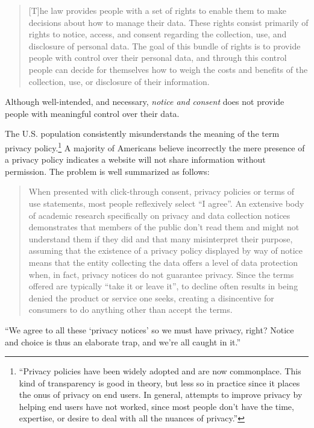\documentclass[11pt, oneside]{article}   	%
\begin{document}
\begin{quote}
	[T]he law provides people with a set of rights to enable them to make decisions about how to manage their data. These rights consist primarily of rights to notice, access, and consent regarding the collection, use, and disclosure of personal data. The goal of this bundle of rights is to provide people with control over their  personal data, and through this  control people can decide for themselves how to weigh the costs and benefits of the collection, use, or disclosure of their information.\cite{Solove2012}
\end{quote} 

Although well-intended, and necessary, \emph{notice and consent} does not provide people with meaningful control over their data. 

The U.S. population consistently misunderstands the meaning of the term privacy policy.\footnote{``Privacy policies have been widely adopted and are now commonplace. This kind of transparency is good in theory, but less so in practice since it places the onus of privacy on end users. In general, attempts to improve privacy by helping end users have not worked, since most people don't have the time, expertise, or desire to deal with all the nuances of privacy.''\cite{Hong2023}} A majority of Americans believe incorrectly the mere presence of a privacy policy indicates a website will not share information without permission.\cite{Draper2019} The problem is well summarized as follows:
\begin{quote}
	When presented with click-through consent, privacy policies or terms of use statements, most people reflexively select ``I agree''. An extensive body of academic research specifically on privacy and data collection notices demonstrates that members of the public don't read them and might not understand them if they did and that many misinterpret their purpose, assuming that the existence of a privacy policy displayed by way of notice means that the entity collecting the data offers a level of data protection when, in fact, privacy notices do not guarantee privacy. Since the terms offered are typically ``take it or leave it'', to decline often results in being denied the product or service one seeks, creating a disincentive for consumers to do anything other than accept the terms.\cite{Flanagan2020}
\end{quote}

``We agree to all these `privacy notices' so we must have privacy, right? Notice and choice is thus an elaborate trap, and we're all caught in it.''\cite{Richards2021}
\end{document}
